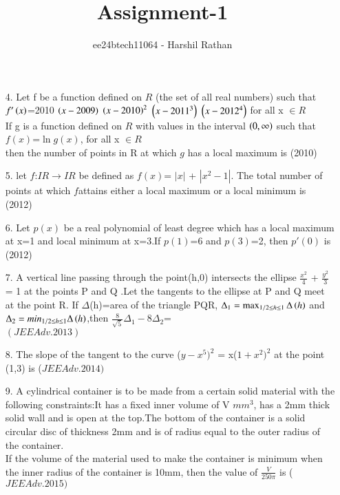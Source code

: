 \documentclass[journal,12pt,twocolumn]{IEEEtran}
\theoremstyle{remark}
\begin{document}

\vspace{3cm}

\title{Assignment-1}
\author{ee24btech11064 - Harshil Rathan}
\maketitle
\newpage
\bigskip

\renewcommand{\thefigure}{\theenumi}
\renewcommand{\thetable}{\theenumi}
\begin{enumerate}
\item[4.] Let f be a function defined on $R$ (the set of all real numbers) such that $f'\left(x\right)$=2010 $\left(x-2009\right)$ $\left(x-2010\right)^2$ $\left(x-2011^3\right)$ $\left(x-2012^4\right)$ for all x $\in R$ \\ If g is a function defined on $R$ with values in the interval $\left(0,\infty\right)$ such that \\

\hspace{1cm}  $f(x)$=$\ln{g(x)}$, for all x $\in R$\\ then the number of points in R at which $g$ has a local maximum is \hfill (2010)\\
\item[5.] let $f$:$IR \rightarrow IR$ be defined as $f(x)$= $|x|$ + $|x^2-1|$. The total number of points at which $f$attains either a local maximum or a local minimum is\\ \hfill (2012) \\
\item[6.]Let $p(x)$ be a real polynomial of least degree which has a local maximum at x=1 and local minimum at x=3.If $p(1)$=6 and $p(3)$=2, then $p'(0)$ is \hfill (2012) \\
\item[7.]A vertical line passing through the point(h,0) intersects the ellipse $\frac{x^2}{4}$ + $\frac{y^2}{3}$ = 1 at the points P and Q .Let the tangents to the ellipse at P and Q meet at the point R. If $\Delta$(h)=area of the triangle PQR, $\Delta_1  = \max _{1/2\leq h \leq 1}\Delta\left(h\right)$ and $\Delta_2 = min_{1/2\leq h \leq 1}\Delta\left(h\right)$,then $\frac{8}{\sqrt{5}}\Delta_1 - 8\Delta_2$=\\\hfill $(JEEAdv.2013)$\\
\item[8.]The slope of the tangent to the curve ($y-x^5)^2$ = x($1+x^2)^2$ at the point (1,3) is \hfill ($JEE Adv. 2014)$ \\
\item[9.]A cylindrical container is to be made from a certain solid material with the following constraints:It has a fixed inner volume of V $mm^3$, has a 2mm thick solid wall and is open at the top.The bottom of the container is a solid circular disc of thickness 2mm and is of radius equal to the outer radius of the container.\\If the volume of the material used to make the container is minimum when the inner radius of the container is 10mm, then the value of $\frac{V}{250\pi}$ is \hfill ($JEE Adv. 2015)$ \\  
\end{enumerate}
\end{document}
